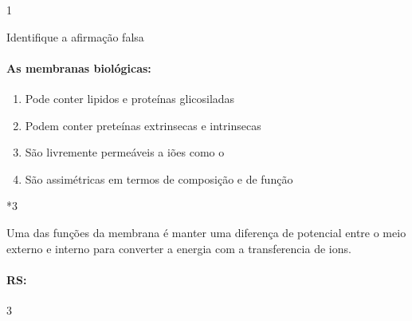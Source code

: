 \documentclass[\mainfilename]{subfiles}
\begin{document}
\begin{questionBox}1{}
    
    Identifique a afirmação {\color{red\Light}falsa}

    \paragraph{As membranas biológicas:}
    \begin{enumerate}
        \item Pode conter lipidos e proteínas glicosiladas
        \item Podem conter preteínas extrinsecas e intrinsecas
        \item São livremente permeáveis a iões como o 
        \item São assimétricas em termos de composição e de função
    \end{enumerate}

    \vspace{-5ex}

    \begin{questionBox}*3{}
        
        Uma das funções da membrana é manter uma diferença de potencial entre o meio externo e interno para converter a energia com a transferencia de ions.
        
    \end{questionBox}

    \paragraph{RS:}3
    
\end{questionBox}
\end{document}
